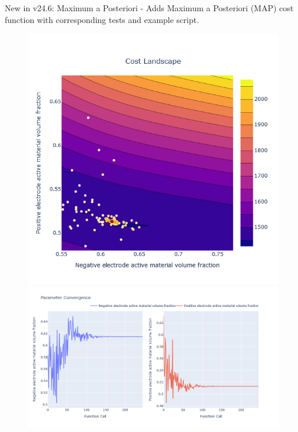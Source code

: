 \documentclass[aspectratio=169]{beamer}
\begin{document}
\begin{frame}{New in v24.6: Maximum a Posteriori}
    \vspace{-6mm}
     - Adds Maximum a Posteriori (MAP) cost function with corresponding tests and example script.
    \begin{figure}
        \centering
        \includegraphics[height=0.35\textwidth]{Images/Highlights/MAP_param_convergence.png}
        \includegraphics[height=0.35\textwidth]{Images/Highlights/MAP_cost_landscape.png}
        \label{fig:MAP_cost}
    \end{figure}
\end{frame}
\end{document}
